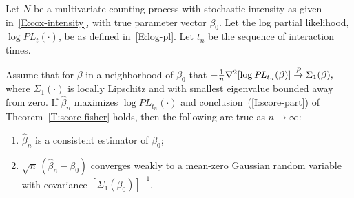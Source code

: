 \documentclass[final]{statsoc}
\begin{document}
\begin{theorem}\label{T:consistency}
    Let $N$ be a multivariate counting process with stochastic
    intensity as given in~\eqref{E:cox-intensity}, with true parameter
    vector $\beta_0$.  Let the log partial likelihood,
    $\log \mathit{PL}_t(\cdot)$, be as defined in~\eqref{E:log-pl}.
    Let $t_n$ be the sequence of interaction times.

    Assume that for $\beta$ in a
    neighborhood of $\beta_0$ that
    \(
        -\tfrac{1}{n} \nabla^2 [ \log \mathit{PL}_{t_n}(\beta)]
            \overset{\mathit{P}}{\to} \Sigma_1(\beta),
    \)
    where $\Sigma_1(\cdot)$ is locally Lipschitz and with smallest
    eigenvalue bounded away from zero.
    If $\hat \beta_n$ maximizes $\log \mathit{PL}_{t_n}(\cdot)$ and
    conclusion~(\ref{I:score-part}) of Theorem~\ref{T:score-fisher} holds,
    then the following are true as $n\to\infty$:
    \begin{enumerate}
        \item $\hat \beta_n$ is a consistent estimator of $\beta_0$;
        \item $\sqrt{n} \, (\hat \beta_n - \beta_0)$ converges weakly
            to a mean-zero Gaussian random variable with covariance
            $[\Sigma_1(\beta_0)]^{-1}$.
    \end{enumerate}
\end{theorem}
\end{document}
